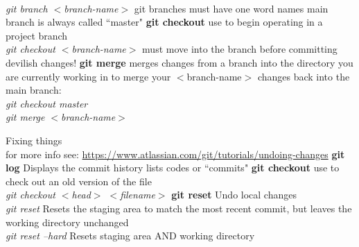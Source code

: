 \documentclass[12pt]{article}
\begin{document}
\begin{outline}[enumerate]
        		\\ {\it git branch $<$branch-name$>$}
        			\4 git branches must have one word names
        			\4  main branch is always called ``master"
	\2 {\bf git checkout}
            	\3 use to begin operating in a project branch
                		\\ {\it git checkout $<$branch-name$>$}
            			\4 must move into the branch before committing devilish changes!
    	\2 {\bf git merge}
        		\3 merges changes from a branch into the directory you are currently working in
        		\3 to merge your $<$branch-name$>$ changes back into the main branch:
        			\\ {\it git checkout master}
    			\\ {\it git merge $<$branch-name$>$}            

\1 Fixing things
             	\\ for more info see: \href{url}{https://www.atlassian.com/git/tutorials/undoing-changes}   
	\2 {\bf git log}
		\3 Displays the commit history 
		\3 lists codes or ``commits" 
	\2 {\bf git checkout}
		\3 use to check out an old version of the file
			\\ {\it git checkout $<$head$>$ $<$filename$>$}
	\2 {\bf git reset}
		\3 Undo local changes
			\\ {\it git reset}
				\4 Resets the staging area to match the most recent commit, but leaves the working directory unchanged
			\\ {\it git reset --hard}
				\4 Resets staging area AND working directory
					

\end{outline}

\clearpage
\end{document}
